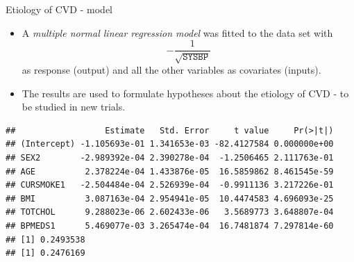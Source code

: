 \documentclass[10pt,ignorenonframetext,]{beamer}
\newenvironment{Shaded}{\begin{snugshade}}{\end{snugshade}}
\newcommand{\KeywordTok}[1]{\textcolor[rgb]{0.13,0.29,0.53}{\textbf{#1}}}
\newcommand{\DataTypeTok}[1]{\textcolor[rgb]{0.13,0.29,0.53}{#1}}
\newcommand{\DecValTok}[1]{\textcolor[rgb]{0.00,0.00,0.81}{#1}}
\newcommand{\StringTok}[1]{\textcolor[rgb]{0.31,0.60,0.02}{#1}}
\newcommand{\OperatorTok}[1]{\textcolor[rgb]{0.81,0.36,0.00}{\textbf{#1}}}
\newcommand{\NormalTok}[1]{#1}
\begin{document}
\begin{frame}

\begin{block}{Etiology of CVD - model}

\begin{itemize}
\item
  A \emph{multiple normal linear regression model} was fitted to the
  data set with \[-\frac{1}{\sqrt{\texttt{SYSBP}}}\] as response
  (output) and all the other variables as covariates (inputs).
\item
  The results are used to formulate hypotheses about the etiology of CVD
  - to be studied in new trials.
\end{itemize}

\end{block}

\end{frame}

\begin{frame}[fragile]

\scriptsize

\begin{Shaded}
\end{Shaded}

\begin{verbatim}
##                  Estimate   Std. Error     t value     Pr(>|t|)
## (Intercept) -1.105693e-01 1.341653e-03 -82.4127584 0.000000e+00
## SEX2        -2.989392e-04 2.390278e-04  -1.2506465 2.111763e-01
## AGE          2.378224e-04 1.433876e-05  16.5859862 8.461545e-59
## CURSMOKE1   -2.504484e-04 2.526939e-04  -0.9911136 3.217226e-01
## BMI          3.087163e-04 2.954941e-05  10.4474583 4.696093e-25
## TOTCHOL      9.288023e-06 2.602433e-06   3.5689773 3.648807e-04
## BPMEDS1      5.469077e-03 3.265474e-04  16.7481874 7.297814e-60
## [1] 0.2493538
## [1] 0.2476169
\end{verbatim}

\end{frame}
\end{document}
